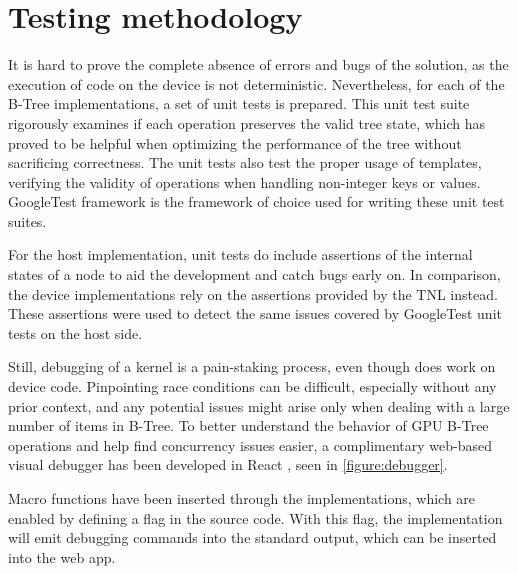 \section{Testing methodology}

It is hard to prove the complete absence of errors and bugs of the solution, as the execution of code on the device is not deterministic. Nevertheless, for each of the B-Tree implementations, a set of unit tests is prepared. This unit test suite rigorously examines if each operation preserves the valid tree state, which has proved to be helpful when optimizing the performance of the tree without sacrificing correctness. The unit tests also test the proper usage of templates, verifying the validity of operations when handling non-integer keys or values. GoogleTest framework \cite{gtest} is the framework of choice used for writing these unit test suites.

For the host implementation, unit tests do include assertions of the internal states of a node to aid the development and catch bugs early on. In comparison, the device implementations rely on the assertions provided by the TNL instead. These assertions were used to detect the same issues covered by GoogleTest unit tests on the host side.

Still, debugging of a kernel is a pain-staking process, even though  does work on device code. Pinpointing race conditions can be difficult, especially without any prior context, and any potential issues might arise only when dealing with a large number of items in B-Tree. To better understand the behavior of GPU B-Tree operations and help find concurrency issues easier, a complimentary web-based visual debugger has been developed in React \cite{react}, seen in \cref{figure:debugger}.

Macro functions have been inserted through the implementations, which are enabled by defining a  flag in the source code. With this flag, the implementation will emit debugging commands into the standard output, which can be inserted into the web app.

